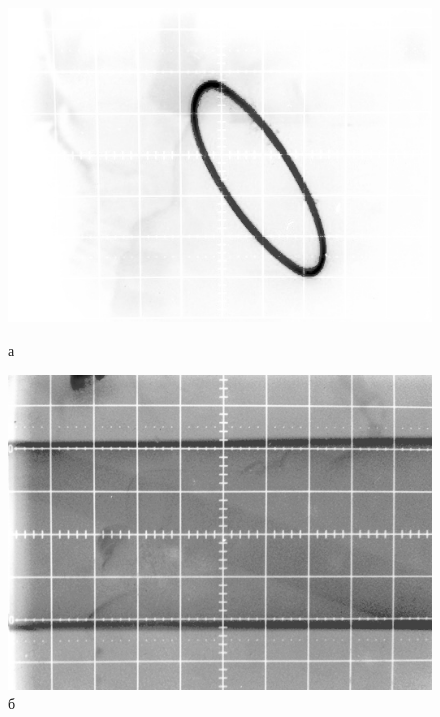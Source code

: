 \begin{figure}[H]
	\begin{minipage}{.45\linewidth}
		\centering
		\includegraphics[width=\linewidth]{img/1s.jpg}
		\caption*{а}
	\end{minipage}
	\begin{minipage}{.45\linewidth}
		\centering
		\includegraphics[width=\linewidth]{img/0s.jpg}
		\caption*{б}
	\end{minipage}
\end{figure}

